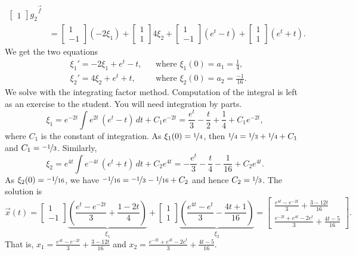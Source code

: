 \begin{example}
\begin{equation*}
\begin{split}
{\begin{bmatrix}
1
\end{bmatrix} g_2
}^{\vec{f}}
\\
& =
\begin{bmatrix}
1 \\
-1
\end{bmatrix} (-2\xi_1) +
\begin{bmatrix}
1 \\
1
\end{bmatrix} 4\xi_2
+
\begin{bmatrix}
1 \\
-1
\end{bmatrix} (e^t - t)
+
\begin{bmatrix}
1 \\
1
\end{bmatrix} (e^t + t) .
\end{split}
\end{equation*}
We get the two equations
\begin{align*}
& \xi_1' = -2\xi_1 + e^t -t, & & \text{where } \xi_1(0) = a_1 = \frac{1}{4} , \\
& \xi_2' = 4\xi_2 + e^t + t, & & \text{where } \xi_2(0) = a_2 = \frac{-1}{16} .
\end{align*}
We solve with the integrating factor method.  Computation of the integral is left as
an exercise to the student.  You will need integration by parts.
\begin{equation*}
\xi_1 = e^{-2t}\int e^{2t} \, (e^t-t) \, dt + C_1 e^{-2t} = 
\frac{e^t}{3}-\frac{t}{2}+\frac{1}{4}+C_1 e^{-2t} ,
\end{equation*}
where $C_1$ is the constant of integration.
As $\xi_1(0) = \nicefrac{1}{4}$, then $\nicefrac{1}{4}= \nicefrac{1}{3}
+ \nicefrac{1}{4} + C_1$ and
$C_1 = \nicefrac{-1}{3}$.
Similarly,
\begin{equation*}
\xi_2 = e^{4t}\int e^{-4t} \, (e^t+ t) \, dt + C_2 e^{4t} = 
-\frac{e^t}{3}-\frac{t}{4}-\frac{1}{16} + C_2 e^{4t} .
\end{equation*}
As $\xi_2(0) = \nicefrac{-1}{16}$, we have $\nicefrac{-1}{16}= \nicefrac{-1}{3}
-\nicefrac{1}{16} + C_2$ and hence
$C_2 = \nicefrac{1}{3}$.
The solution is
\begin{equation*}
\vec{x}(t)=
\begin{bmatrix}
1 \\
-1
\end{bmatrix}
\underbrace{\left( \frac{e^t-e^{-2t}}{3}+\frac{1-2t}{4} \right)}%
_{\xi_1} +
\begin{bmatrix}
1 \\
1
\end{bmatrix}
\underbrace{\left( \frac{e^{4t}-e^t}{3}-\frac{4t+1}{16} \right)}%
_{\xi_2}
=
\begin{bmatrix}
\frac{e^{4t}-e^{-2t}}{3}+\frac{3-12t}{16} \\
\frac{e^{-2t}+e^{4t}-2e^t}{3}+\frac{4t-5}{16}
\end{bmatrix} .
\end{equation*}
That is,
$x_1 = \frac{e^{4t}-e^{-2t}}{3}+\frac{3-12t}{16}$
and
$x_2 = \frac{e^{-2t}+e^{4t}-2e^t}{3}+\frac{4t-5}{16}$.
\end{example}

